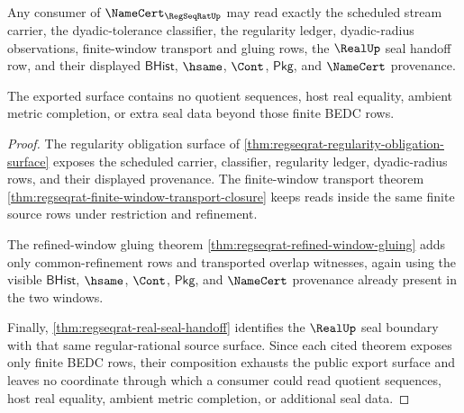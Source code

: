 \begin{theorem}
\label{thm:regseqrat-public-source-export}
Any consumer of $\NameCert_{\RegSeqRatUp}$ may read exactly the scheduled stream carrier, the dyadic-tolerance classifier, the regularity ledger, dyadic-radius observations, finite-window transport and gluing rows, the $\RealUp$ seal handoff row, and their displayed $\mathsf{BHist}$, $\hsame$, $\Cont$, $\mathsf{Pkg}$, and $\NameCert$ provenance.

The exported surface contains no quotient sequences, host real equality, ambient metric completion, or extra seal data beyond those finite BEDC rows.
\end{theorem}
\begin{proof}
The regularity obligation surface of \autoref{thm:regseqrat-regularity-obligation-surface} exposes the scheduled carrier, classifier, regularity ledger, dyadic-radius rows, and their displayed provenance. The finite-window transport theorem \autoref{thm:regseqrat-finite-window-transport-closure} keeps reads inside the same finite source rows under restriction and refinement.

The refined-window gluing theorem \autoref{thm:regseqrat-refined-window-gluing} adds only common-refinement rows and transported overlap witnesses, again using the visible $\mathsf{BHist}$, $\hsame$, $\Cont$, $\mathsf{Pkg}$, and $\NameCert$ provenance already present in the two windows.

Finally, \autoref{thm:regseqrat-real-seal-handoff} identifies the $\RealUp$ seal boundary with that same regular-rational source surface. Since each cited theorem exposes only finite BEDC rows, their composition exhausts the public export surface and leaves no coordinate through which a consumer could read quotient sequences, host real equality, ambient metric completion, or additional seal data.
\end{proof}

